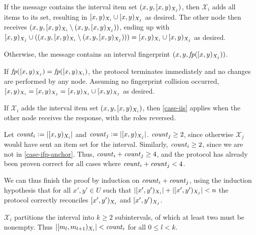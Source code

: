 \begin{caselist}
 \label{case-iis}  If the message contains the interval item set $({x}, {y}, [{x},{y})_{X_j})$, then $\mathcal{X}_i$ adds all items to its set, resulting in $[{x},{y})_{X_i} \cup [{x},{y})_{X_j}$ as desired. The other node then receives $({x}, {y}, {[{x},{y})_{X_i} \setminus ({x}, {y}, [{x},{y})_{X_j})})$, ending up with $[{x},{y})_{X_j} \cup (({x}, {y}, {[{x},{y})_{X_i} \setminus ({x}, {y}, [{x},{y})_{X_j})})) = [{x},{y})_{X_i} \cup [{x},{y})_{X_j}$ as desired.

 \label{case-ifp} Otherwise, the message contains an interval fingerprint $({x}, {y}, {\mathit{fp}([{x},{y})_{X_j})})$.

\begin{caselist}
 If $\mathit{fp}([{x},{y})_{X_j}) = \mathit{fp}([{x},{y})_{X_i})$, the protocol terminates immediately and no changes are performed by any node. Assuming no fingerprint collision occurred, $[{x},{y})_{X_i} = [{x},{y})_{X_j} = [{x},{y})_{X_i} \cup [{x},{y})_{X_j}$ as desired.

 \label{case-ifp-anchor} If $\mathcal{X}_i$ adds the interval item set $({x}, {y}, [{x},{y})_{X_i})$, then \cref{case-iis} applies when the other node receives the response, with the roles reversed.

\case[Recurse] Let $\mathit{count}_{i} \vcentcolon= |{[{x},{y})_{X_i}}|$ and $\mathit{count}_{j} \vcentcolon= |{[{x},{y})_{X_j}}|$. $\mathit{count}_{j} \geq 2$, since otherwise $\mathcal{X}_j$ would have sent an item set for the interval. Similarly, $\mathit{count}_{i} \geq 2$, since we are not in \cref{case-ifp-anchor}. Thus, $\mathit{count}_{i} + \mathit{count}_{j} \geq 4$, and the protocol has already been proven correct for all cases where $\mathit{count}_{i} + \mathit{count}_{j} < 4$. 

We can thus finish the proof by induction on $\mathit{count}_{i} + \mathit{count}_{j}$, using the induction hypothesis that for all $x', y' \in U$ such that $|{[{x'},{y'})_{X_i}}| + |{[{x'},{y'})_{X_j}}| < n$ the protocol correctly reconciles $[{x'},{y'})_{X_i}$ and $[{x'},{y'})_{X_j}$.

$\mathcal{X}_i$ partitions the interval into $k \geq 2$ subintervals, of which at least two must be nonempty. Thus $|{[{m_l},{m_{l + 1}})_{X_i}}| < \mathit{count}_{i}$ for all $0 \leq l < k$.
\end{caselist}
\end{caselist}

